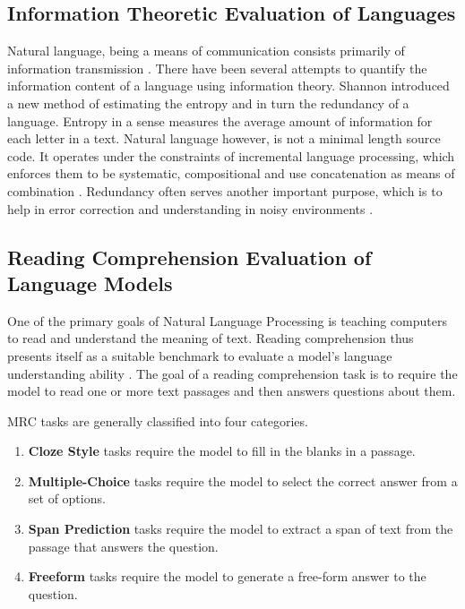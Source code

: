 \subsection{Information Theoretic Evaluation of Languages}
Natural language, being a means of communication consists primarily of information transmission \cite{debowskiInformationTheoryLanguage2020}. There have
been several attempts to quantify the information content of a language using information theory. Shannon \cite{shannonPredictionEntropyPrinted1951} introduced a new
method of estimating the entropy and in turn the redundancy of a language. Entropy in a sense measures the average amount of information for each letter in a text.
Natural language however, is not a minimal length source code. It operates under the constraints of incremental language processing, which enforces them to be
systematic, compositional and use concatenation as means of combination  \cite{futrellInformationTheoryBridge2022}. Redundancy often serves another
important purpose, which is to help in error correction and understanding in noisy environments \cite{gibsonHowEfficiencyShapes2019}.

\subsection{Reading Comprehension Evaluation of Language Models}
One of the primary goals of Natural Language Processing is teaching computers to read and understand the meaning of text. Reading comprehension 
thus presents itself as a suitable benchmark to evaluate a model's language understanding ability \cite{zengSurveyMachineReading2020}.  The goal 
of a reading comprehension task is to require the model to read one or more text passages and then answers questions about them. 

MRC tasks are generally classified into four categories. 
\begin{enumerate}
    \item \textbf{Cloze Style} tasks require the model to fill in the blanks in a passage. 
    \item \textbf{Multiple-Choice} tasks require the model to select the correct answer from a set of options.
    \item \textbf{Span Prediction} tasks require the model to extract a span of text from the passage that answers the question.
    \item \textbf{Freeform} tasks require the model to generate a free-form answer to the question.
\end{enumerate}

